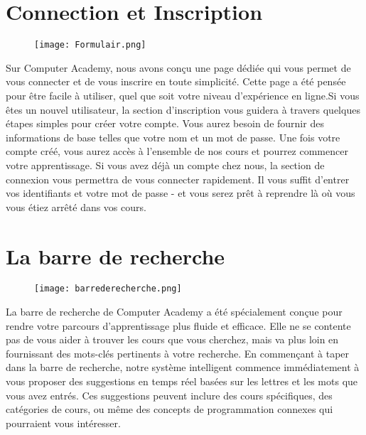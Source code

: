 \documentclass{article}
\begin{document}
\section{Connection et Inscription}
\begin{figure}[h]
\centering
\texttt{[image: Formulair.png]} 
\end{figure}
Sur Computer Academy, nous avons conçu une page dédiée qui vous permet de vous connecter et de vous inscrire en toute simplicité. Cette page a été pensée pour être facile à utiliser, quel que soit votre niveau d'expérience en ligne.Si vous êtes un nouvel utilisateur, la section d'inscription vous guidera à travers quelques étapes simples pour créer votre compte. Vous aurez besoin de fournir des informations de base telles que votre nom et un mot de passe. Une fois votre compte créé, vous aurez accès à l'ensemble de nos cours et pourrez commencer votre apprentissage.
Si vous avez déjà un compte chez nous, la section de connexion vous permettra de vous connecter rapidement. Il vous suffit d'entrer vos identifiants et votre mot de passe - et vous serez prêt à reprendre là où vous vous étiez arrêté dans vos cours.
\section{La barre de recherche}
\begin{figure}[h]
\centering
\texttt{[image: barrederecherche.png]} 
\end{figure}
La barre de recherche de Computer Academy a été spécialement conçue pour rendre votre parcours d'apprentissage plus fluide et efficace. Elle ne se contente pas de vous aider à trouver les cours que vous cherchez, mais va plus loin en fournissant des mots-clés pertinents à votre recherche.
En commençant à taper dans la barre de recherche, notre système intelligent commence immédiatement à vous proposer des suggestions en temps réel basées sur les lettres et les mots que vous avez entrés. Ces suggestions peuvent inclure des cours spécifiques, des catégories de cours, ou même des concepts de programmation connexes qui pourraient vous intéresser.
\newpage
\end{document}
